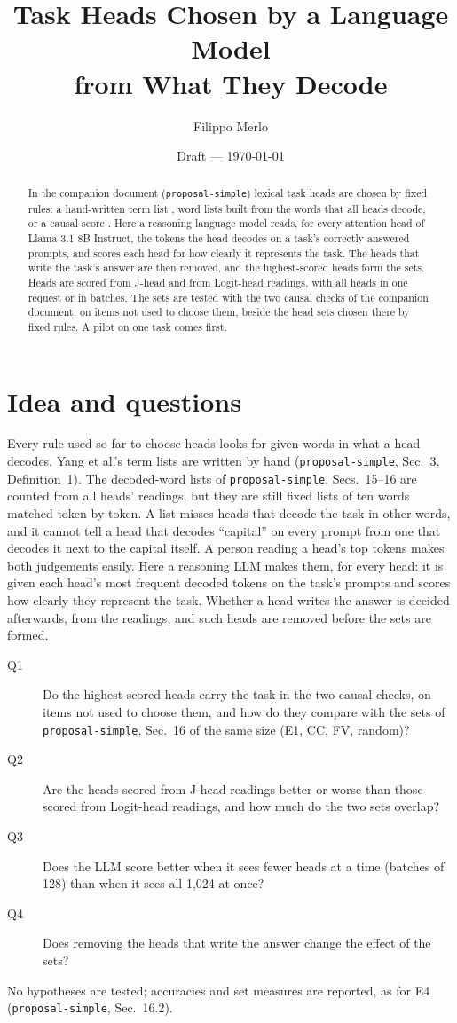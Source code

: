 \documentclass[11pt,a4paper]{article}
\title{Task Heads Chosen by a Language Model\\ from What They Decode}
\author{Filippo Merlo}
\date{Draft --- \today}
\newcommand{\simple}[1]{\texttt{proposal-simple}, #1}
\begin{document}
\maketitle

\begin{abstract}
In the companion document (\texttt{proposal-simple}) lexical task heads are chosen by fixed rules: a hand-written term list \citep{yang2026shared}, word lists built from the words that all heads decode, or a causal score \citep{davidson2025different}. Here a reasoning language model reads, for every attention head of Llama-3.1-8B-Instruct, the tokens the head decodes on a task's correctly answered prompts, and scores each head for how clearly it represents the task. The heads that write the task's answer are then removed, and the highest-scored heads form the sets. Heads are scored from J-head and from Logit-head readings, with all heads in one request or in batches. The sets are tested with the two causal checks of the companion document, on items not used to choose them, beside the head sets chosen there by fixed rules. A pilot on one task comes first.
\end{abstract}

\section{Idea and questions}\label{sec:idea}

Every rule used so far to choose heads looks for given words in what a head decodes. Yang et al.'s term lists are written by hand (\simple{Sec.~3, Definition~1}). The decoded-word lists of \simple{Secs.~15--16} are counted from all heads' readings, but they are still fixed lists of ten words matched token by token. A list misses heads that decode the task in other words, and it cannot tell a head that decodes ``capital'' on every prompt from one that decodes it next to the capital itself. A person reading a head's top tokens makes both judgements easily. Here a reasoning LLM makes them, for every head: it is given each head's most frequent decoded tokens on the task's prompts and scores how clearly they represent the task. Whether a head writes the answer is decided afterwards, from the readings, and such heads are removed before the sets are formed.

\begin{description}
  \item[Q1] Do the highest-scored heads carry the task in the two causal checks, on items not used to choose them, and how do they compare with the sets of \simple{Sec.~16} of the same size (E1, CC, FV, random)?
  \item[Q2] Are the heads scored from J-head readings better or worse than those scored from Logit-head readings, and how much do the two sets overlap?
  \item[Q3] Does the LLM score better when it sees fewer heads at a time (batches of 128) than when it sees all 1{,}024 at once?
  \item[Q4] Does removing the heads that write the answer change the effect of the sets?
\end{description}
No hypotheses are tested; accuracies and set measures are reported, as for E4 (\simple{Sec.~16.2}).
\end{document}
